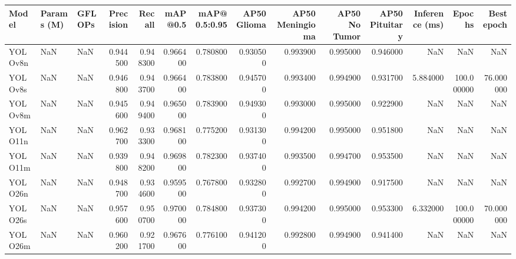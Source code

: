 \begin{tabular}{lllrrrrrrrrrrr}
\toprule
Model & Params (M) & GFLOPs & Precision & Recall & mAP@0.5 & mAP@0.5:0.95 & AP50 Glioma & AP50 Meningioma & AP50 No Tumor & AP50 Pituitary & Inference (ms) & Epochs & Best epoch \\
\midrule
YOLOv8n & NaN & NaN & 0.944500 & 0.948300 & 0.966400 & 0.780800 & 0.930500 & 0.993900 & 0.995000 & 0.946000 & NaN & NaN & NaN \\
YOLOv8s & NaN & NaN & 0.946800 & 0.943700 & 0.966400 & 0.783800 & 0.945700 & 0.993400 & 0.994900 & 0.931700 & 5.884000 & 100.000000 & 76.000000 \\
YOLOv8m & NaN & NaN & 0.945600 & 0.949400 & 0.965000 & 0.783900 & 0.949300 & 0.993000 & 0.995000 & 0.922900 & NaN & NaN & NaN \\
YOLO11n & NaN & NaN & 0.962700 & 0.933300 & 0.968100 & 0.775200 & 0.931300 & 0.994200 & 0.995000 & 0.951800 & NaN & NaN & NaN \\
YOLO11m & NaN & NaN & 0.939800 & 0.948200 & 0.969800 & 0.782300 & 0.937400 & 0.993500 & 0.994700 & 0.953500 & NaN & NaN & NaN \\
YOLO26n & NaN & NaN & 0.948700 & 0.934600 & 0.959500 & 0.767800 & 0.932800 & 0.992700 & 0.994900 & 0.917500 & NaN & NaN & NaN \\
YOLO26s & NaN & NaN & 0.957600 & 0.950700 & 0.970000 & 0.784800 & 0.937300 & 0.994200 & 0.995000 & 0.953300 & 6.332000 & 100.000000 & 70.000000 \\
YOLO26m & NaN & NaN & 0.960200 & 0.921700 & 0.967600 & 0.776100 & 0.941200 & 0.992800 & 0.994900 & 0.941400 & NaN & NaN & NaN \\
\bottomrule
\end{tabular}
